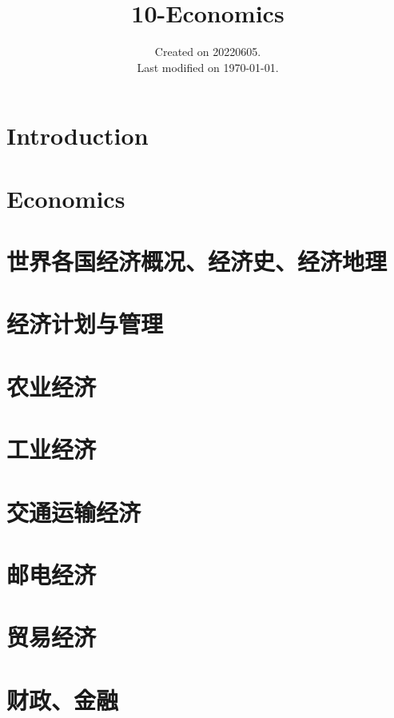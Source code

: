 \documentclass[UTF8]{../RepresentationUniverse}
\begin{document}
\title{10-Economics}
\date{Created on 20220605.\\   Last modified on \today.}
\maketitle
\tableofcontents


\chapter{Introduction}



\chapter{Economics}


\chapter{世界各国经济概况、经济史、经济地理}

\chapter{经济计划与管理}

\chapter{农业经济}

\chapter{工业经济}

\chapter{交通运输经济}

\chapter{邮电经济}

\chapter{贸易经济}

\chapter{财政、金融}
\end{document}
